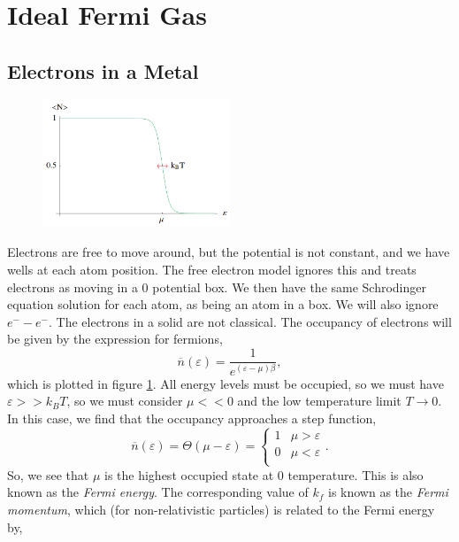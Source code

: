 \documentclass{book}
\begin{document}
\section{Ideal Fermi Gas}
\subsection{Electrons in a Metal}
\begin{figure}[h]
	\centering
	\includegraphics[width=0.5\textwidth]{fermion.png}
	\caption{}
	\label{eq:fermion}
\end{figure}
Electrons are free to move around, but the potential is not constant, and we have wells at each atom position. The free electron model ignores this and treats electrons as moving in a 0 potential box. We then have the same Schrodinger equation solution for each atom, as being an atom in a box. We will also ignore $e^- - e^-$. The electrons in a solid are not classical. The occupancy of electrons will be given by the expression for fermions,
\begin{equation}
	\overline{n}(\varepsilon)  = \frac{1}{e^{(\varepsilon - \mu)\beta}},
\end{equation}
which is plotted in figure \ref{eq:fermion}. All energy levels must be occupied, so we must have $\varepsilon >> k_BT$, so we must consider $\mu << 0$ and the low temperature limit $T \to 0$. In this case, we find that the occupancy approaches a step function,
\begin{equation}
	\overline{n}(\varepsilon) = \Theta(\mu - \varepsilon) = \begin{cases}
		1 & \mu > \varepsilon \\
		0 & \mu < \varepsilon \\
	\end{cases}.
\end{equation}
So, we see that $\mu$ is the highest occupied state at 0 temperature. This is also known as the \textit{Fermi energy}. The corresponding value of $k_f$ is known as the \textit{Fermi momentum}, which (for non-relativistic particles) is related to the Fermi energy by,
\end{document}
